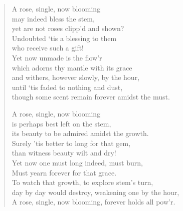 \begin{verse}
  A rose, single, now blooming\\
  \vin may indeed bless the stem,\\
  yet are not roses clipp’d and shown?\\
  \vin Undoubted ‘tis a blessing to them\\
  who receive such a gift!\\
  \vin Yet now unmade is the flow’r\\
  which adorns thy mantle with its grace\\
  \vin and withers, however slowly, by the hour,\\
  \vin \vin until ‘tis faded to nothing and dust,\\
  \vin \vin though some scent remain forever amidst the must.

  A rose, single, now blooming\\
  \vin is perhaps best left on the stem,\\
  its beauty to be admired amidst the growth.\\
  \vin Surely 'tis better to long for that gem,\\
  than witness beauty wilt and dry!\\
  \vin Yet now one must long indeed, must burn,\\
  Must yearn forever for that grace.\\
  \vin To watch that growth, to explore stem's turn,\\
  \vin \vin day by day would destroy, weakening one by the hour,\\
  \vin \vin A rose, single, now blooming, forever holds all pow'r.
\end{verse}
